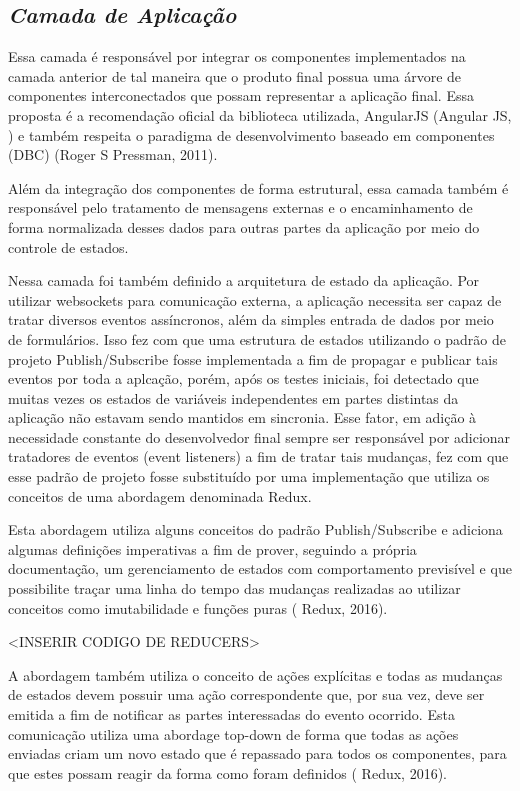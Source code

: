 \subsection{{\it Camada de Aplicação}}

Essa camada é responsável por integrar os componentes implementados na camada anterior de tal maneira que o produto final possua uma árvore de componentes interconectados que possam representar a aplicação final. Essa proposta é a recomendação oficial da biblioteca utilizada, AngularJS (Angular JS, ) e também respeita o paradigma de desenvolvimento baseado em componentes (DBC) (Roger S Pressman, 2011).

Além da integração dos componentes de forma estrutural, essa camada também é responsável pelo tratamento de mensagens externas e o encaminhamento de forma normalizada desses dados para outras partes da aplicação por meio do controle de estados.

Nessa camada foi também definido a arquitetura de estado da aplicação. Por utilizar websockets para comunicação externa, a aplicação necessita ser capaz de tratar diversos eventos assíncronos, além da simples entrada de dados por meio de formulários. Isso fez com que uma estrutura de estados utilizando o padrão de projeto Publish/Subscribe fosse implementada a fim de propagar e publicar tais eventos por toda a aplcação, porém, após os testes iniciais, foi detectado que muitas vezes os estados de variáveis independentes em partes distintas da aplicação não estavam sendo mantidos em sincronia. Esse fator, em adição à necessidade constante do desenvolvedor final sempre ser responsável por adicionar tratadores de eventos (event listeners) a fim de tratar tais mudanças, fez com que esse padrão de projeto fosse substituído por uma implementação que utiliza os conceitos de uma abordagem denominada Redux.

Esta abordagem utiliza alguns conceitos do padrão Publish/Subscribe e adiciona algumas definições imperativas a fim de prover, seguindo a própria documentação, um gerenciamento de estados com comportamento previsível e que possibilite traçar uma linha do tempo das mudanças realizadas ao utilizar conceitos como imutabilidade e funções puras ( Redux, 2016).

<INSERIR CODIGO DE REDUCERS>

A abordagem também utiliza o conceito de ações explícitas e todas as mudanças de estados devem possuir uma ação correspondente que, por sua vez, deve ser emitida a fim de notificar as partes interessadas do evento ocorrido. Esta comunicação utiliza uma abordage top-down de forma que todas as ações enviadas criam um novo estado que é repassado para todos os componentes, para que estes possam reagir da forma como foram definidos ( Redux, 2016).

